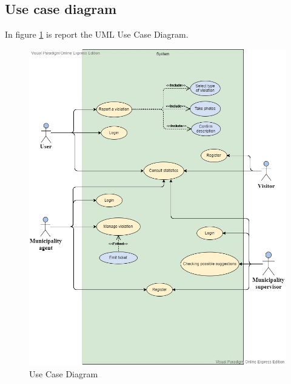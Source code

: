 \documentclass[a4paper]{report}
\begin{document}
\subsection{Use case diagram}
In figure \ref{fig:useCases} is report the UML Use Case Diagram.
\begin{figure}[hpt]
\includegraphics[width=\textwidth]{UseCaseDiagram}
\caption{Use Case Diagram}
\label{fig:useCases}
\end{figure}
\end{document}
